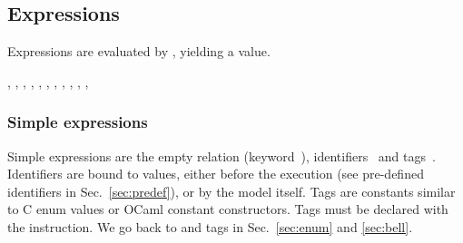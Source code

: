 \subsection{\label{language:expression}Expressions}
Expressions are evaluated by \herd, yielding a value.
\begin{syntax}
 \is{} 
\alt {}
\alt {}
\alt \T{(}\T{)} \orelse \T{(}  \T{,}  \brepet{} \T{,}  \erepet \T{)}
\alt \T{\{}\T{\}} \orelse \T{\{}  \brepet{} \T{,}  \erepet \T{\}}
\alt {}\T{*} \orelse {}\T{+} \orelse {}
\orelse {}
\alt \T{\textasciitilde}
\alt \T{[}\T{]}
\alt {}\T{|} \orelse
{}\T{++} \orelse
{}\T{;} \orelse
{}\T{\textbackslash} \orelse
{}\T{\&} \orelse
{} \T{*} 
\alt {} 
\alt {}  \T{->} 
\alt {} \boption{}  \eoption {} \brepet{}   \erepet{}  
\alt {}    
\alt \T{(}\T{)} \orelse  {}  
\alt {} \T{[}\T{]}
\sep
\sep
{} \is {} 
\sep
{} \is {} \T{,} 
\sep
{} \is {} \orelse \T{(}\T{)} \orelse \T{(}  \brepet{} \T{,}  \erepet \T{)}
\sep
{} \is {} \orelse {}
\sep
{} \is {} \T{=} 
\sep
{} \is {}  \T{=} 
\sep
\sep
{} \is {} \orelse {}
\sep
{} \is \boption{} \T{||} \eoption {} \T{->} 
\brepet{} \T{||}  \T{->}  \erepet
\boption \T{\_} \T{->}  \eoption
\sep
{} \is \boption{} \T{||} \eoption \T{\{}\T{\}} \T{->} 
\T{||}  \T{++}  \T{->} 
\end{syntax}

\subsubsection*{Simple expressions}
Simple expressions are the empty relation (keyword~),
identifiers~ and tags~.  Identifiers are bound to
values, either before the execution (see pre-defined identifiers in
Sec.~\ref{sec:predef}), or by the model itself.  Tags are constants similar to
C enum values or OCaml constant constructors.  Tags must be declared with the
 instruction. We go back to  and tags in Sec.~\ref{sec:enum}
and \ref{sec:bell}.

